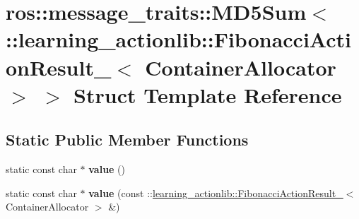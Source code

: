 \hypertarget{structros_1_1message__traits_1_1MD5Sum_3_01_1_1learning__actionlib_1_1FibonacciActionResult___3_01ContainerAllocator_01_4_01_4}{}\section{ros\+:\+:message\+\_\+traits\+:\+:M\+D5\+Sum$<$ \+:\+:learning\+\_\+actionlib\+:\+:Fibonacci\+Action\+Result\+\_\+$<$ Container\+Allocator $>$ $>$ Struct Template Reference}
\label{structros_1_1message__traits_1_1MD5Sum_3_01_1_1learning__actionlib_1_1FibonacciActionResult___3_01ContainerAllocator_01_4_01_4}
\subsection*{Static Public Member Functions}
\begin{DoxyCompactItemize}
\item 
\mbox{\label{structros_1_1message__traits_1_1MD5Sum_3_01_1_1learning__actionlib_1_1FibonacciActionResult___3_01ContainerAllocator_01_4_01_4_a972c14970752aed01ac536d185442b8a}} 
static const char $\ast$ {\bfseries value} ()
\item 
\mbox{\label{structros_1_1message__traits_1_1MD5Sum_3_01_1_1learning__actionlib_1_1FibonacciActionResult___3_01ContainerAllocator_01_4_01_4_a6730c782e39821fbd5172e01e92fd0c8}} 
static const char $\ast$ {\bfseries value} (const \+::\hyperlink{structlearning__actionlib_1_1FibonacciActionResult__}{learning\+\_\+actionlib\+::\+Fibonacci\+Action\+Result\+\_\+}$<$ Container\+Allocator $>$ \&)
\end{DoxyCompactItemize}
